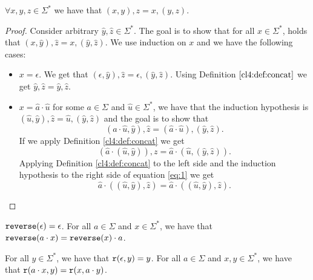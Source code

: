 \begin{theorem}[Associativity]
\label{cl4:thrm:assoc}
$\forall x,y,z \in \Sigma^*$ we have that $(x,y),z = x,(y,z)$.
    
\end{theorem}
\begin{proof} Consider arbitrary $\hat{y}, \hat{z} \in \Sigma^*$. The goal is to show that for all $x \in \Sigma^*$, holds that $(x, \hat{y}),\hat{z} = x , (\hat{y}, \hat{z})$. We use induction on $x$ and we have the following cases:
    \begin{itemize}
        \item \textbf{$x = \epsilon$}. We get that $(\epsilon, \hat{y}), \hat{z} = \epsilon, (\hat{y}, \hat{z})$. Using Definition $\ref{cl4:def:concat}$ we get $\hat{y},\hat{z} = \hat{y},\hat{z}$.
        \item \textbf{$x = \hat{a}\cdot \hat{u}$} for some $a \in \Sigma$ and $\hat{u} \in \Sigma^*$, we have that the induction hypothesis is $(\hat{u}, \hat{y}), \hat{z} = \hat{u},(\hat{y}, \hat{z})$ and the goal is to show that 
        \begin{equation}
            (\hat{a}\cdot \hat{u}, \hat{y}), \hat{z} = (\hat{a} \cdot \hat{u}), (\hat{y}, \hat{z}).
        \end{equation}  
        If we apply Definition \ref{cl4:def:concat} we get
        \begin{equation}
            (\hat{a}\cdot (\hat{u}, \hat{y})), z = \hat{a}\cdot(\hat{u}, (\hat{y}, \hat{z})).
            \label{eq:1}
        \end{equation}
        Applying Definition \ref{cl4:def:concat} to the left side and the induction hypothesis to the right side of equation \ref{eq:1} we get
        \begin{equation}
            \hat{a} \cdot ((\hat{u}, \hat{y}), \hat{z}) = \hat{a} \cdot ((\hat{u}, \hat{y}), \hat{z}). 
        \end{equation}
    \end{itemize}
\end{proof}

\begin{definition}[$\reverseA$]
$\mathtt{reverse}(\epsilon) = \epsilon$.
For all $a \in \Sigma$ and $x \in \Sigma^*$, we have that $\mathtt{reverse}(a\cdot x) = \mathtt{reverse}(x)\cdot a$.
    \label{cl4:def:rev1}
\end{definition}


\begin{definition}[$\reverseB$]
\label{cl4:def:rev2}
For all $y\in \Sigma^*$, we have that $\mathtt{r}(\epsilon, y) = y$.
For all $a\in \Sigma$ and $x, y\in \Sigma^*$, we have that $\mathtt{r}(a \cdot x, y) = \mathtt{r}(x, a\cdot y)$.
\end{definition}



